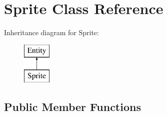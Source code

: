 \hypertarget{class_sprite}{}\section{Sprite Class Reference}
\label{class_sprite}
Inheritance diagram for Sprite\+:\begin{figure}[H]
\begin{center}
\leavevmode
\includegraphics[height=2.000000cm]{class_sprite}
\end{center}
\end{figure}
\subsection*{Public Member Functions}
